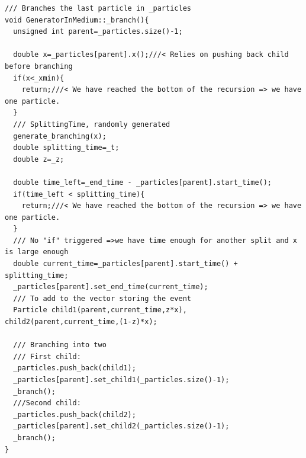 \documentclass[a4paper,12pt]{article}
\numberwithin{equation}{section}
\begin{document}
\begin{lstlisting}
/// Branches the last particle in _particles
void GeneratorInMedium::_branch(){
  unsigned int parent=_particles.size()-1;

  double x=_particles[parent].x();///< Relies on pushing back child before branching
  if(x<_xmin){
    return;///< We have reached the bottom of the recursion => we have one particle.
  }
  /// SplittingTime, randomly generated
  generate_branching(x);
  double splitting_time=_t;
  double z=_z;

  double time_left=_end_time - _particles[parent].start_time();
  if(time_left < splitting_time){
    return;///< We have reached the bottom of the recursion => we have one particle.
  }
  /// No "if" triggered =>we have time enough for another split and x is large enough
  double current_time=_particles[parent].start_time() + splitting_time;
  _particles[parent].set_end_time(current_time);
  /// To add to the vector storing the event
  Particle child1(parent,current_time,z*x), child2(parent,current_time,(1-z)*x);

  /// Branching into two
  /// First child:
  _particles.push_back(child1);
  _particles[parent].set_child1(_particles.size()-1);
  _branch();
  ///Second child:
  _particles.push_back(child2);
  _particles[parent].set_child2(_particles.size()-1);
  _branch();
}
\end{lstlisting}
\end{document}
